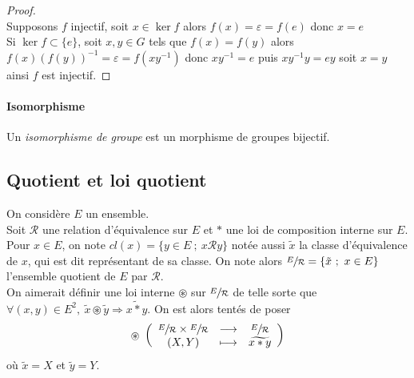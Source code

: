 		
		
		\begin{proof} ${}$\\
		\fbox{$\Rightarrow$} Supposons $f$ injectif, soit $x\in \ker f$ alors $f(x) = \varepsilon = f(e)$ donc $x=e$\\
		\fbox{$\Leftarrow$} Si $\ker f \subset\{e\}$, soit $x,y\in G$ tels que $f(x)=f(y)$ alors $f(x)(f(y))^{-1} = \varepsilon = f(xy^{-1})$ donc $xy^{-1} = e$ puis $xy^{-1}y=ey$ soit $x=y$ ainsi $f$ est injectif.
		\end{proof} \medskip 
		
		\traitd
		\paragraph{Isomorphisme}
			Un \emph{isomorphisme de groupe} est un morphisme de groupes bijectif. 
		\trait
		
		 \medskip
		
		
	\subsection{Quotient et loi quotient}
	
		On considère $E$ un ensemble. \\ 
		Soit $\mathcal{R}$ une relation d'équivalence sur $E$ et $\ast$ une loi de composition interne sur $E$. \\
		
		Pour $x\in E$, on note $cl(x)=\{y\in E ~;~ x\mathcal{R} y\}$ notée aussi $\tilde{x}$ la classe d'équivalence de $x$, qui est dit représentant de sa classe. On note alors $\sfrac{E}{\mathcal{R}} = \{ \tilde{x} ~;~x\in E\}$ l'ensemble quotient de $E$ par $\mathcal{R}$. \\
		
		On aimerait définir une loi interne $\circledast$ sur $\sfrac{E}{\mathcal{R}}$ de telle sorte que $\forall (x,y)\in E^2 ,~ \tilde{x}\circledast\tilde{y} \Rightarrow \widetilde{x\ast y}$. On est alors tentés de poser 
		\[ 
			\circledast ~\appli{ \sfrac{E}{\mathcal{R}}\times\sfrac{E}{\mathcal{R}}}{(X,Y)}{\sfrac{E}{\mathcal{R}}}{\widetilde{x\ast y}}
		\] 
		où $\tilde{x} = X$ et $\tilde{y}=Y$.\\
		
